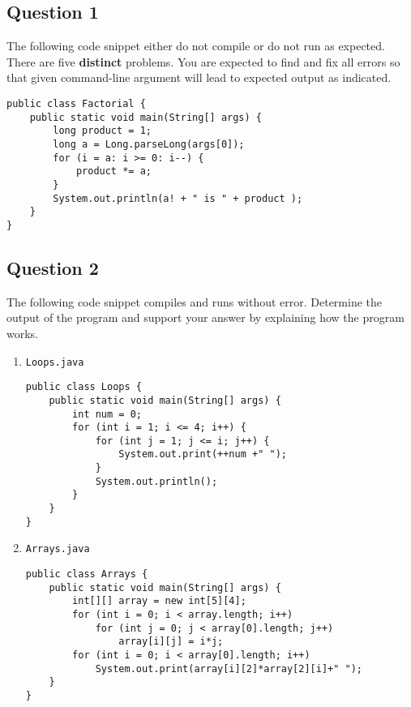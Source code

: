 \documentclass[12pt,letterpaper,twoside]{article}
\begin{document}


\subsection*{Question 1}

The following code snippet either do not compile or do not run as expected. There are five \textbf{distinct} problems. You are expected to find and fix all errors so that given command-line argument will lead to expected output as indicated.

\begin{lstlisting}
public class Factorial {
	public static void main(String[] args) {
		long product = 1;
		long a = Long.parseLong(args[0]);
		for (i = a: i >= 0: i--) {
			product *= a;
		}
		System.out.println(a! + " is " + product );
	}
}
\end{lstlisting}

\newpage

\subsection*{Question 2}

The following code snippet compiles and runs without error. Determine the output of the program and support your answer by explaining how the program works.

\begin{enumerate}[label=(\alph*)]
\item \texttt{Loops.java}
\begin{lstlisting}
public class Loops {
	public static void main(String[] args) {
		int num = 0;
		for (int i = 1; i <= 4; i++) {
			for (int j = 1; j <= i; j++) {
				System.out.print(++num +" ");
			}
			System.out.println();
		}
	}
}
\end{lstlisting}
\item \texttt{Arrays.java}
\begin{lstlisting}
public class Arrays {
	public static void main(String[] args) {
		int[][] array = new int[5][4];
		for (int i = 0; i < array.length; i++)
			for (int j = 0; j < array[0].length; j++)
				array[i][j] = i*j;
		for (int i = 0; i < array[0].length; i++)
			System.out.print(array[i][2]*array[2][i]+" ");
	}
}
\end{lstlisting}
\end{enumerate}
\end{document}
